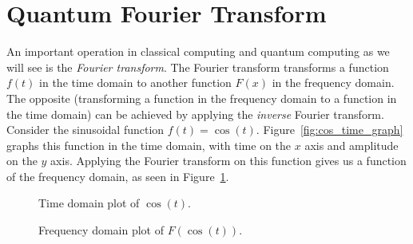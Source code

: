 \section{Quantum Fourier Transform}
An important operation in classical computing and quantum computing as we will see is the \emph{Fourier transform}. The Fourier transform transforms a function $f(t)$ in the time domain to another function $F(x)$ in the frequency domain. The opposite (transforming a function in the frequency domain to a function in the time domain) can be achieved by applying the \emph{inverse} Fourier transform. Consider the sinusoidal function $f(t) = \cos(t)$. Figure~\ref{fig:cos_time_graph} graphs this function in the time domain, with time on the $x$ axis and amplitude on the $y$ axis. Applying the Fourier transform on this function gives us a function of the frequency domain, as seen in Figure~\ref{fig:cos_freq_graph}.
\begin{figure}[ht]
  \centering
  \begin{multicols}{2}
    \caption{Time domain plot of $\cos(t)$.}
    \label{fig:cos_time_graph}

    \caption{Frequency domain plot of $F(\cos(t))$.}
    \label{fig:cos_freq_graph}
  \end{multicols}
\end{figure}

